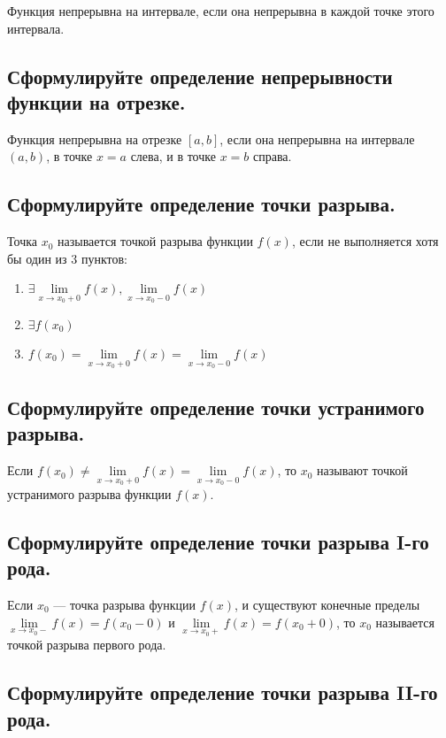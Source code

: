 \documentclass[a4paper, 10pt]{article}
\begin{document}
    Функция непрерывна на интервале, если она непрерывна в каждой точке этого интервала.

    \subsection{Сформулируйте определение непрерывности функции на отрезке.}

    Функция непрерывна на отрезке $[a,b]$, если она непрерывна на интервале $(a, b)$,
    в точке $x = a$ слева, и в точке $x = b$ справа.

    \subsection{Сформулируйте определение точки разрыва.}

    Точка $x_0$ называется точкой разрыва функции $f(x)$, если не выполняется хотя бы один из 3 пунктов:
    \begin{enumerate}
        \item $\exists\lim\limits_{x \to x_0 + 0}f(x),\lim\limits_{x \to x_0 - 0}f(x)$
        \item $\exists f(x_0)$
        \item $f(x_0) = \lim\limits_{x \to x_0 + 0}f(x) = \lim\limits_{x \to x_0 - 0}f(x)$
    \end{enumerate} 

    \subsection{Сформулируйте определение точки устранимого разрыва.}

    Если $f(x_0) \ne \lim\limits_{x \to x_0 + 0}f(x) = \lim\limits_{x \to x_0 - 0}f(x)$, то 
    $x_0$ называют точкой устранимого разрыва функции $f(x)$.

    \subsection{Сформулируйте определение точки разрыва I-го рода.}
    
    Если $x_0$ — точка разрыва функции $f(x)$, и существуют конечные пределы
    $\lim\limits_{x \to x_0-} f(x) = f(x_0 - 0)$ и $\lim\limits_{x \to x_0+} f(x) = f(x_0 + 0)$,
    то $x_0$ называется точкой разрыва первого рода.

    \subsection{Сформулируйте определение точки разрыва II-го рода.}
    
\end{document}
